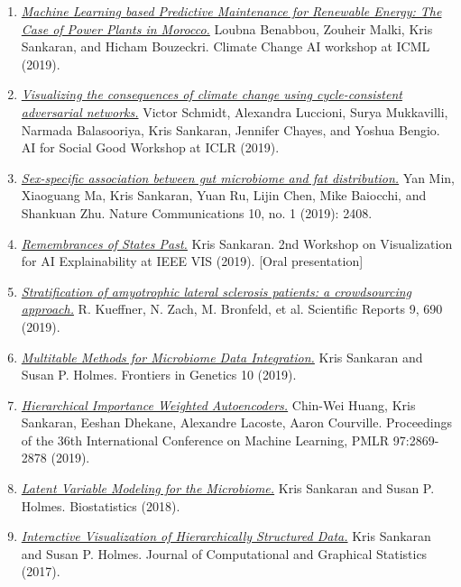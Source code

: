 \documentclass[letterpaper]{article}
\begin{document}
\begin{enumerate}
  \item \href{https://s3.us-east-1.amazonaws.com/climate-change-ai/papers/icml2019/35/paper.pdf}{\textit{Machine Learning based Predictive Maintenance for Renewable Energy: The Case of Power Plants in Morocco.}} Loubna Benabbou, Zouheir Malki, Kris Sankaran, and Hicham Bouzeckri. Climate Change AI workshop at ICML (2019).
  \item \href{https://arxiv.org/abs/1905.03709}{\textit{Visualizing the consequences of climate change using cycle-consistent adversarial networks.}} Victor Schmidt, Alexandra Luccioni, Surya Mukkavilli, Narmada Balasooriya, Kris Sankaran, Jennifer Chayes, and Yoshua Bengio. AI for Social Good Workshop at ICLR (2019).
  \item \href{https://doi.org/10.1038/s41467-019-10440-5}{\textit{Sex-specific association between gut microbiome and fat distribution.}} Yan Min, Xiaoguang Ma, Kris Sankaran, Yuan Ru, Lijin Chen, Mike Baiocchi, and Shankuan Zhu. Nature Communications 10, no. 1 (2019): 2408.
  \item \href{https://observablehq.com/@krisrs1128/remembrances-of-states-past}{\textit{Remembrances of States Past.}} Kris Sankaran. 2nd Workshop on Visualization for AI Explainability at IEEE VIS (2019). [Oral presentation]
  \item {\href{https://doi.org/10.1038/s41598-018-36873-4}{\textit{Stratification of amyotrophic lateral sclerosis patients: a crowdsourcing approach.}} R. Kueffner, N. Zach, M. Bronfeld, et al. Scientific Reports 9, 690 (2019). }
  \item \href{https://doi.org/10.3389/fgene.2019.00627}{\textit{Multitable Methods for Microbiome Data Integration.}} Kris Sankaran and Susan P. Holmes. Frontiers in Genetics 10 (2019).
  \item \href{http://proceedings.mlr.press/v97/huang19d/huang19d.pdf}{\textit{Hierarchical Importance Weighted Autoencoders.}} Chin-Wei Huang, Kris Sankaran, Eeshan Dhekane, Alexandre Lacoste, Aaron Courville. Proceedings of the 36th International Conference on Machine Learning, PMLR 97:2869-2878 (2019).
  \item \href{https://doi.org/10.1093/biostatistics/kxy018}{\textit{Latent Variable Modeling for the Microbiome.}} Kris Sankaran and Susan P. Holmes. Biostatistics (2018).
  \item \href{https://doi.org/10.1080/10618600.2017.1392866}{\textit{Interactive Visualization of Hierarchically Structured Data.}} Kris Sankaran and Susan P. Holmes. Journal of Computational and Graphical Statistics (2017).

\end{enumerate}
\end{document}
